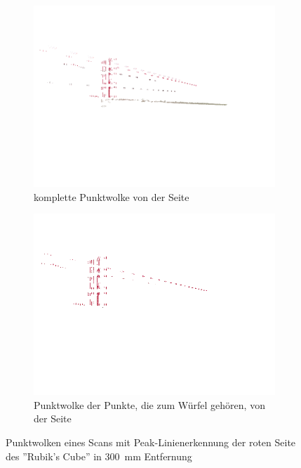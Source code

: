 \documentclass[ngerman,a4paper,parskip=half]{scrartcl}
\begin{document}
\begin{figure}[H]
\begin{subfigure}{0.45\textwidth}
		\includegraphics[width=\textwidth,frame,trim=0 120 0 20,clip]{includes/peak_red_pos1.png}
		\caption{komplette Punktwolke von der Seite \\ \mbox{}}
	\end{subfigure}
	\hfill
	\begin{subfigure}{0.45\textwidth}
		\includegraphics[width=\textwidth,frame,trim=0 120 0 20,clip]{includes/peak_only_red_pos1.png}
		\caption{Punktwolke der Punkte, die zum Würfel gehören, von der Seite}
	\end{subfigure}
	\caption{Punktwolken eines Scans mit Peak-Linienerkennung der roten Seite des ''Rubik's Cube'' in 300~mm Entfernung}
\end{figure}
\end{document}
